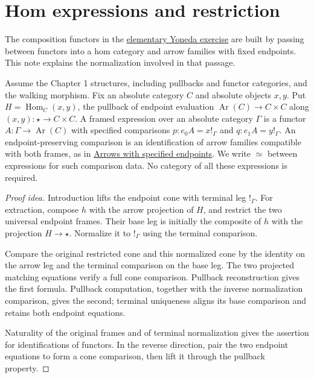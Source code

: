 \documentclass[11pt]{article}
\begin{document}
\section*{Hom expressions and restriction}

The composition functors in the
\href{chapter-2-exercises.html}{elementary Yoneda exercise} are built by
passing between functors into a hom category and arrow families with fixed
endpoints. This note explains the normalization involved in that passage.

Assume the Chapter 1 structures, including pullbacks and functor categories,
and the walking morphism. Fix an absolute category $C$ and absolute objects $x,y$. Put
$H=\operatorname{Hom}_C(x,y)$, the pullback of endpoint evaluation
$\operatorname{Ar}(C)\to C\times C$ along $(x,y)\colon\star\to C\times C$.
A framed expression over an absolute category $\Gamma$ is a functor
$A\colon\Gamma\to\operatorname{Ar}(C)$ with specified comparisons
$p\colon e_0A=x!_\Gamma$ and $q\colon e_1A=y!_\Gamma$.
An endpoint-preserving comparison is an identification of arrow families
compatible with both frames, as in
\href{supplementary-arrows-with-specified-endpoints.html}{Arrows with specified endpoints}.
We write $\simeq$ between expressions for such comparison data.
No category of all these expressions is required.

\begin{proof}[Proof idea]
Introduction lifts the endpoint cone with terminal leg $!_\Gamma$.
For extraction, compose $h$ with the arrow projection of $H$, and restrict
the two universal endpoint frames. Their base leg is initially the
composite of $h$ with the projection $H\to\star$. Normalize it to
$!_\Gamma$ using the terminal comparison.

Compare the original restricted cone and this normalized cone by the
identity on the arrow leg and the terminal comparison on the base leg.
The two projected matching equations verify a full cone comparison.
Pullback reconstruction gives the first formula. Pullback computation,
together with the inverse normalization comparison, gives the second;
terminal uniqueness aligns its base comparison and retains both endpoint equations.

Naturality of the original frames and of terminal normalization gives the
assertion for identifications of functors. In the reverse direction, pair
the two endpoint equations to form a cone comparison, then lift it through
the pullback property.
\end{proof}
\end{document}
